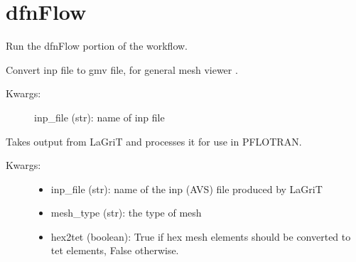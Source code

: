 \documentclass[letterpaper,10pt,english]{sphinxmanual}
\begin{document}
\section{dfnFlow}
\label{pydfnworks:module-pydfnworks.flow}\label{pydfnworks:dfnflow}

\begin{fulllineitems}
\label{pydfnworks:pydfnworks.flow.dfnFlow}
Run the dfnFlow portion of the workflow.

\end{fulllineitems}


\begin{fulllineitems}
\label{pydfnworks:pydfnworks.flow.inp2gmv}
Convert inp file to gmv file, for general mesh viewer .
\begin{description}
\item[{Kwargs:}] \leavevmode
inp\_file (str): name of inp file

\end{description}

\end{fulllineitems}


\begin{fulllineitems}
\label{pydfnworks:pydfnworks.flow.lagrit2pflotran}
Takes output from LaGriT and processes it for use in PFLOTRAN.
\begin{description}
\item[{Kwargs:}] \leavevmode\begin{itemize}
\item {} 
inp\_file (str): name of the inp (AVS) file produced by LaGriT

\item {} 
mesh\_type (str): the type of mesh

\item {} 
hex2tet (boolean): True if hex mesh elements should be converted to tet elements, False otherwise.

\end{itemize}

\end{description}

\end{fulllineitems}
\end{document}
